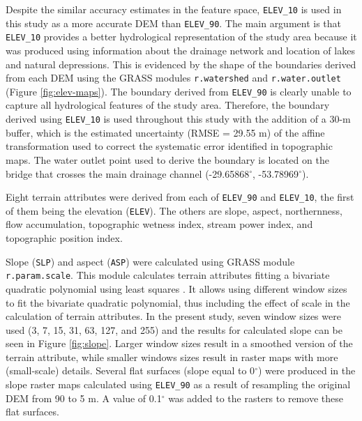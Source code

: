 Despite the similar accuracy estimates in the feature space, \texttt{ELEV\_10} is used in this study as a more accurate DEM than \texttt{ELEV\_90}. The main argument is that \texttt{ELEV\_10} provides a better hydrological representation of the study area because it was produced using information about the drainage network and location of lakes and natural depressions. This is evidenced by the shape of the boundaries derived from each DEM using the GRASS modules \texttt{r.watershed} and \texttt{r.water.outlet} (Figure \ref{fig:elev-maps}). The boundary derived from \texttt{ELEV\_90} is clearly unable to capture all hydrological features of the study area. Therefore, the boundary derived using \texttt{ELEV\_10} is used throughout this study with the addition of a 30-m buffer, which is the estimated uncertainty (RMSE = 29.55 m) of the affine transformation used to correct the systematic error identified in topographic maps. The water outlet point used to derive the boundary is located on the bridge that crosses the main drainage channel (-29.65868$^\circ$, -53.78969$^\circ$).


Eight terrain attributes were derived from each of \texttt{ELEV\_90} and \texttt{ELEV\_10}, the first of them being the elevation (\texttt{ELEV}). The others are slope, aspect, northernness, flow accumulation, topographic wetness index, stream power index, and topographic position index.

Slope (\texttt{SLP}) and aspect (\texttt{ASP}) were calculated using GRASS module \texttt{r.param.scale}. This module calculates terrain attributes fitting a bivariate quadratic polynomial using least squares \cite{Wood1996}. It allows using different window sizes to fit the bivariate quadratic polynomial, thus including the effect of scale in the calculation of terrain attributes. In the present study, seven window sizes were used (3, 7, 15, 31, 63, 127, and 255) and the results for calculated slope can be seen in Figure \ref{fig:slope}. Larger window sizes result in a smoothed version of the terrain attribute, while smaller windows sizes result in raster maps with more (small-scale) details. Several flat surfaces (slope equal to 0$^\circ$) were produced in the slope raster maps calculated using \texttt{ELEV\_90} as a result of resampling the original DEM from 90 to 5 m. A value of 0.1$^\circ$ was added to the rasters to remove these flat surfaces.

